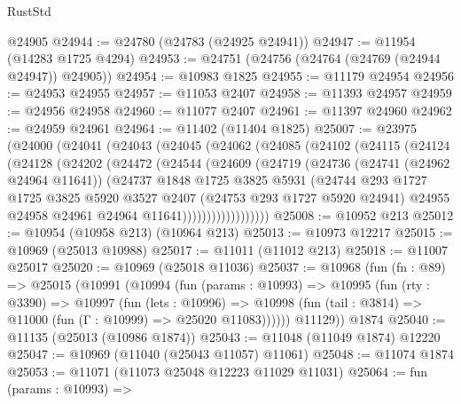 \begin{lexlean}{RustStd}
\begin{coremodule}
    @24905
@24944 := @24780 (@24783 (@24925 @24941))
@24947 := @11954 (@14283 @1725 @4294)
@24953 := @24751 (@24756 (@24764 (@24769 (@24944 @24947)) @24905))
@24954 := @10983 @1825
@24955 := @11179 @24954
@24956 := @24953 @24955
@24957 := @11053 @2407
@24958 := @11393 @24957
@24959 := @24956 @24958
@24960 := @11077 @2407
@24961 := @11397 @24960
@24962 := @24959 @24961
@24964 := @11402 (@11404 @1825)
@25007 := @23975
    (@24000
      (@24041
        (@24043
          (@24045
            (@24062
              (@24085
                (@24102
                  (@24115
                    (@24124
                      (@24128
                        (@24202
                          (@24472
                            (@24544
                              (@24609
                                (@24719
                                  (@24736
                                    (@24741 (@24962 @24964 @11641))
                                    (@24737
                                      @1848
                                      @1725
                                      @3825
                                      @5931
                                      (@24744
                                        @293
                                        @1727
                                        @1725
                                        @3825
                                        @5920
                                        @3527
                                        @2407
                                        (@24753 @293 @1727 @5920 @24941)
                                        @24955
                                        @24958
                                        @24961
                                        @24964
                                        @11641))))))))))))))))))
@25008 := @10952 @213
@25012 := @10954 (@10958 @213) (@10964 @213)
@25013 := @10973 @12217
@25015 := @10969 (@25013 @10988)
@25017 := @11011 (@11012 @213)
@25018 := @11007 @25017
@25020 := @10969 (@25018 @11036)
@25037 := @10968
    (fun (fn : @89) =>
    @25015
      (@10991
        (@10994
          (fun (params : @10993) =>
          @10995
            (fun (rty : @3390) =>
            @10997
              (fun (lets : @10996) =>
              @10998 (fun (tail : @3814) => @11000 (fun (Γ : @10999) => @25020 @11083))))))
        @11129))
    @1874
@25040 := @11135 (@25013 (@10986 @1874))
@25043 := @11048 (@11049 @1874) @12220
@25047 := @10969 (@11040 (@25043 @11057) @11061)
@25048 := @11074 @1874
@25053 := @11071 (@11073 @25048 @12223 @11029 @11031)
@25064 := fun (params : @10993) =>

\end{coremodule}
\end{lexlean}
